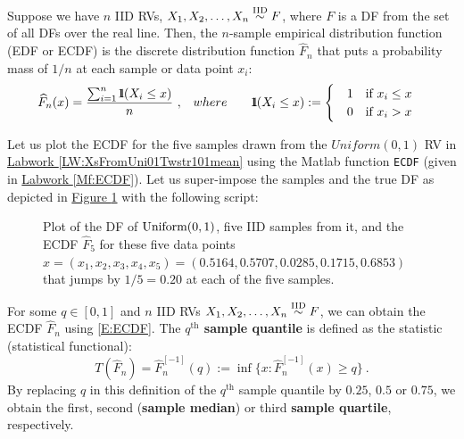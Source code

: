 \begin{definition}\label{D:ECDF}
Suppose we have $n$ IID RVs, $X_1,X_2,\ldots,X_n \overset{{\rm IID}}{\sim} F$, where $F$ is a DF from the set of all DFs over the real line.  Then, the $n$-sample empirical distribution function (EDF or ECDF) is the discrete  distribution function $\widehat{F}_n$ that puts a probability mass of $1/n$ at each sample or data point $x_i$:
\begin{eqnarray} \label{E:ECDF}
\widehat{F}_n(x) = \frac{ \sum_{i=1}^n \BB{1}(X_i \leq x) }{n} \ ,  & \quad where \qquad
\BB{1}(X_i \leq x) :=
\begin{cases}
& 1  \quad \text{if $x_i \leq x$} \\
& 0  \quad \text{if $x_i > x$} 
\end{cases}
\end{eqnarray}
\end{definition}

\begin{labwork}\label{LW:ECDF}
Let us plot the ECDF for the five samples drawn from the $Uniform(0,1)$ RV in \hyperref[LW:XsFromUni01Twstr101mean]{Labwork \ref*{LW:XsFromUni01Twstr101mean}} using the {\sc Matlab} function {\tt ECDF} (given in \hyperref[Mf:ECDF]{Labwork \ref*{Mf:ECDF}}).  Let us super-impose the samples and the true DF as depicted in \hyperref[F:plotUniform01ECDF5]{Figure \ref*{F:plotUniform01ECDF5}} with the following script:
{}

\begin{figure}[htpb]
\caption{Plot of the DF of $\mbox{{\rm Uniform}}(0,1)$, five IID samples from it, and the ECDF $\widehat{F}_5$ for these five data points $x=(x_1,x_2,x_3,x_4,x_5)=(0.5164,    0.5707,    0.0285,    0.1715,    0.6853)$ that jumps by $1/5=0.20$ at each of the five samples.\label{F:plotUniform01ECDF5}}
\centering   {}
\end{figure}
\end{labwork}

\begin{definition}
For some $q \in [0,1]$ and $n$ IID RVs $X_1,X_2,\ldots,X_n \overset{{\rm IID}}{\sim} F$, we can obtain the ECDF $\widehat{F}_n$ using \eqref{E:ECDF}.  The {\bf $q^{\text{th}}$ sample quantile} is defined as the statistic (statistical functional):
\begin{equation}\label{E:qthSampleQuantile}
T(\widehat{F}_n) = \widehat{F}_n^{[-1]}(q) := \inf{ \{ x:  \widehat{F}_n^{[-1]}(x) \geq q \} } \ .
\end{equation}
By replacing $q$ in this definition of the $q^{\text{th}}$ sample quantile by $0.25$, $0.5$ or $0.75$, we obtain the first, second ({\bf sample median}) or third {\bf sample quartile}, respectively.
\end{definition}

